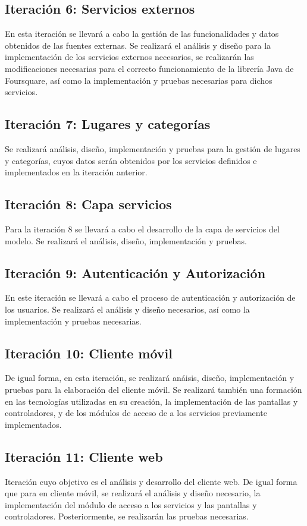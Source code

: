 \subsection{Iteración 6: Servicios externos}
En esta iteración se llevará a cabo la gestión de las funcionalidades y datos obtenidos de las fuentes externas. Se realizará el análisis y diseño para la implementación de los servicios externos necesarios, se realizarán las modificaciones necesarias para el correcto funcionamiento de la librería Java de Foursquare, así como la implementación y pruebas necesarias para dichos servicios.


\subsection{Iteración 7: Lugares y categorías}
Se realizará análisis, diseño, implementación y pruebas para la gestión de lugares y categorías, cuyos datos serán obtenidos por los servicios definidos e implementados en la iteración anterior.


\subsection{Iteración 8: Capa servicios}
Para la iteración 8 se llevará a cabo el desarrollo de la capa de servicios del modelo. Se realizará el análisis, diseño, implementación y pruebas.


\subsection{Iteración 9: Autenticación y Autorización}
En este iteración se llevará a cabo el proceso de autenticación y autorización de los usuarios. Se realizará el análisis y diseño necesarios, así como la implementación y pruebas necesarias.


\subsection{Iteración 10: Cliente móvil}
De igual forma, en esta iteración, se realizará anáisis, diseño, implementación y pruebas para la elaboración del cliente móvil. Se realizará también una formación en las tecnologías utilizadas en su creación, la implementación de las pantallas y controladores, y de los módulos de acceso de a los servicios previamente implementados.


\subsection{Iteración 11: Cliente web}
Iteración cuyo objetivo es el análisis y desarrollo del cliente web. De igual forma que para en cliente móvil, se realizará el análisis y diseño necesario, la implementación del módulo de acceso a los servicios y las pantallas y controladores. Posteriormente, se realizarán las pruebas necesarias.



